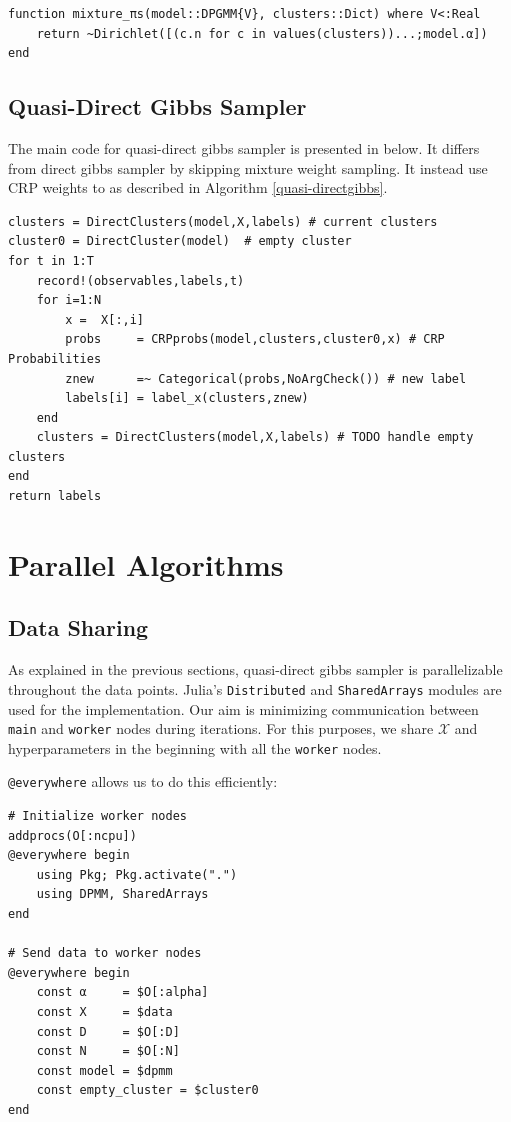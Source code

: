 \documentclass[a4paper]{article}
\begin{document}
\begin{lstlisting}[linewidth=16cm]
function mixture_πs(model::DPGMM{V}, clusters::Dict) where V<:Real
    return ~Dirichlet([(c.n for c in values(clusters))...;model.α])
end
\end{lstlisting}


\subsection{Quasi-Direct Gibbs Sampler}

The main code for quasi-direct gibbs sampler is presented in below. It differs from direct gibbs sampler by skipping mixture weight sampling. It instead use CRP weights to as described in Algorithm \ref{quasi-directgibbs}.

\begin{lstlisting}
clusters = DirectClusters(model,X,labels) # current clusters
cluster0 = DirectCluster(model)  # empty cluster
for t in 1:T
    record!(observables,labels,t)
    for i=1:N
        x =  X[:,i]
        probs     = CRPprobs(model,clusters,cluster0,x) # CRP Probabilities
        znew      =~ Categorical(probs,NoArgCheck()) # new label
        labels[i] = label_x(clusters,znew)
    end
    clusters = DirectClusters(model,X,labels) # TODO handle empty clusters
end
return labels
\end{lstlisting}



\section{Parallel Algorithms}


\subsection{Data Sharing}

As explained in the previous sections, quasi-direct gibbs sampler is
parallelizable throughout the data points. Julia's \texttt{Distributed}
and \texttt{SharedArrays} modules are used for the implementation. Our
aim is minimizing communication between \texttt{main} and
\texttt{worker} nodes during iterations. For this purposes, we share
\(\mathcal{X}\) and hyperparameters in the beginning with all the
\texttt{worker} nodes.

\texttt{@everywhere} allows us to do this efficiently:
\begin{lstlisting}
# Initialize worker nodes
addprocs(O[:ncpu])
@everywhere begin
    using Pkg; Pkg.activate(".")
    using DPMM, SharedArrays
end

# Send data to worker nodes
@everywhere begin
    const α     = $O[:alpha]
    const X     = $data
    const D     = $O[:D]
    const N     = $O[:N]
    const model = $dpmm
    const empty_cluster = $cluster0
end
\end{lstlisting}
\end{document}
